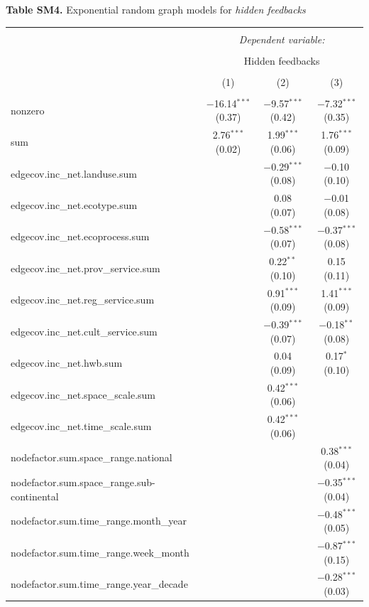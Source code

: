 \documentclass[9pt,]{article}
\begin{document}
\textbf{Table SM4.} Exponential random graph models for
\textit{hidden feedbacks}

\begingroup  \footnotesize 

\begin{tabular}{@{\extracolsep{5pt}}lccc} 
\\[-1.8ex]\hline 
\hline \\[-1.8ex] 
 & \multicolumn{3}{c}{\textit{Dependent variable:}} \\ 
\cline{2-4} 
\\[-1.8ex] & \multicolumn{3}{c}{Hidden feedbacks} \\ 
\\[-1.8ex] & (1) & (2) & (3)\\ 
\hline \\[-1.8ex] 
 nonzero & $-$16.14$^{***}$ (0.37) & $-$9.57$^{***}$ (0.42) & $-$7.32$^{***}$ (0.35) \\ 
  sum & 2.76$^{***}$ (0.02) & 1.99$^{***}$ (0.06) & 1.76$^{***}$ (0.09) \\ 
  edgecov.inc\_net.landuse.sum &  & $-$0.29$^{***}$ (0.08) & $-$0.10 (0.10) \\ 
  edgecov.inc\_net.ecotype.sum &  & 0.08 (0.07) & $-$0.01 (0.08) \\ 
  edgecov.inc\_net.ecoprocess.sum &  & $-$0.58$^{***}$ (0.07) & $-$0.37$^{***}$ (0.08) \\ 
  edgecov.inc\_net.prov\_service.sum &  & 0.22$^{**}$ (0.10) & 0.15 (0.11) \\ 
  edgecov.inc\_net.reg\_service.sum &  & 0.91$^{***}$ (0.09) & 1.41$^{***}$ (0.09) \\ 
  edgecov.inc\_net.cult\_service.sum &  & $-$0.39$^{***}$ (0.07) & $-$0.18$^{**}$ (0.08) \\ 
  edgecov.inc\_net.hwb.sum &  & 0.04 (0.09) & 0.17$^{*}$ (0.10) \\ 
  edgecov.inc\_net.space\_scale.sum &  & 0.42$^{***}$ (0.06) &  \\ 
  edgecov.inc\_net.time\_scale.sum &  & 0.42$^{***}$ (0.06) &  \\ 
  nodefactor.sum.space\_range.national &  &  & 0.38$^{***}$ (0.04) \\ 
  nodefactor.sum.space\_range.sub-continental &  &  & $-$0.35$^{***}$ (0.04) \\ 
  nodefactor.sum.time\_range.month\_year &  &  & $-$0.48$^{***}$ (0.05) \\ 
  nodefactor.sum.time\_range.week\_month &  &  & $-$0.87$^{***}$ (0.15) \\ 
  nodefactor.sum.time\_range.year\_decade &  &  & $-$0.28$^{***}$ (0.03) \\ 

\end{tabular}
\end{document}
